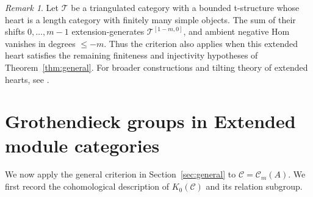 \documentclass[pdflatex,sn-mathphys-num]{sn-jnl}
\numberwithin{equation}{section}
\theoremstyle{definition}
\theoremstyle{remark}\newtheorem{remark}[theorem]{Remark}
\newcommand{\C}{\mathcal C}
\begin{document}
\begin{remark}\label{rem:hearts}
Let $\mathcal T$ be a triangulated category with a bounded t-structure whose heart is a length category with finitely many simple objects. The sum of their shifts $0,\ldots,m-1$ extension-generates
$\mathcal T^{[1-m,0]}$, and ambient negative Hom vanishes in degrees
$\leq-m$. Thus the criterion also applies when this extended heart
satisfies the remaining finiteness and injectivity hypotheses of
Theorem~\ref{thm:general}. For broader constructions and tilting
theory of extended hearts, see \cite{MNO,WZ}.
\end{remark}

\section{Grothendieck groups in Extended module categories}\label{sec:module}
We now apply the general criterion in Section~\ref{sec:general} to $\C=\C_m(A)$. We first record
the cohomological description of $K_0(\C)$ and its relation subgroup.
\end{document}

